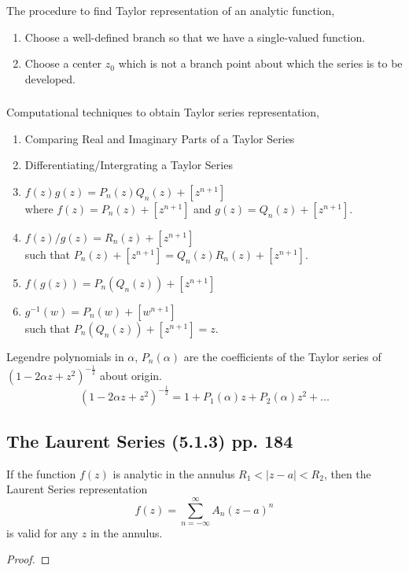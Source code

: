 \subsubsection*{}
The procedure to find Taylor representation of an analytic function,
\begin{enumerate}
	\item Choose a well-defined branch so that we have a single-valued function.
	\item Choose a center $z_0$ which is not a branch point about which the series is to be developed.
\end{enumerate}

\subsubsection*{}
Computational techniques to obtain Taylor series representation,
\begin{enumerate}
	\item Comparing Real and Imaginary Parts of a Taylor Series
	\item Differentiating/Intergrating a Taylor Series
	\item $f(z)g(z) = P_n(z)Q_n(z) + [z^{n+1}]$ \\ where $f(z) = P_n(z) + [z^{n+1}]$ and $g(z) = Q_n(z) + [z^{n+1}]$.
	\item $f(z)/g(z) = R_n(z) + [z^{n+1}]$\\ such that $P_n(z) + [z^{n+1}] = Q_n(z)R_n(z) + [z^{n+1}]$.
	\item $f(g(z)) = P_n(Q_n(z)) + [z^{n+1}]$
	\item $g^{-1}(w) = P_n(w) + [w^{n+1}]$ \\ such that $P_n(Q_n(z)) + [z^{n+1}] = z$.
\end{enumerate}

\begin{definition}
	Legendre polynomials in $\alpha$, $P_n(\alpha)$ are the coefficients of the Taylor series of $(1-2\alpha z + z^2)^{-\frac{1}{2}}$ about origin.
	\begin{equation}
		(1-2\alpha z + z^2)^{-\frac{1}{2}} = 1 + P_1(\alpha)z + P_2(\alpha)z^2+\dots
	\end{equation}
\end{definition}

\subsection{The Laurent Series (5.1.3) pp. 184}
\begin{remark}
	If the function $f(z)$ is analytic in the annulus $R_1 < |z-a| < R_2$, then the Laurent Series representation
	\begin{equation}
		f(z) = \sum_{n = -\infty}^\infty A_n (z-a)^n
	\end{equation}
	is valid for any $z$ in the annulus.
\end{remark}
\begin{proof}
\end{proof}

